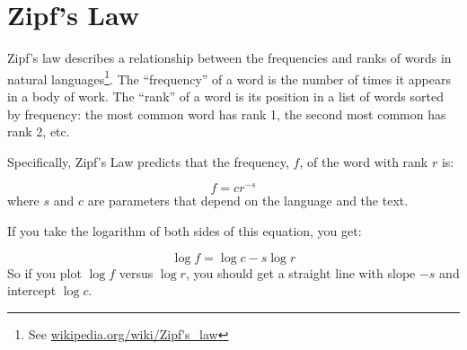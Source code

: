 \documentclass[10pt]{book}
\begin{document}
\section{Zipf's Law}

Zipf's law describes a relationship between the frequencies and ranks
of words in natural languages\footnote{See
  \url{wikipedia.org/wiki/Zipf's_law}}.  The ``frequency'' of
a word is the number of times it appears in a body of work.
The ``rank'' of a word is its position in a list of words
sorted by frequency: the most common word has rank 1, the
second most common has rank 2, etc.

Specifically, Zipf's Law
predicts that the frequency, $f$, of the word with rank $r$ is:

\[ f = c r^{-s} \]
%
where $s$ and $c$ are parameters that depend on the language and the
text.

If you take the logarithm of both sides of this equation, you get:


\[ \log f = \log c - s \log r \]
%
So if you plot $\log f$ versus $\log r$, you should get
a straight line with slope $-s$ and intercept $\log c$.
\end{document}
